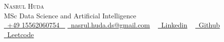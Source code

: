 \begin{center}
    {\Huge \scshape Nasrul Huda} \\ \vspace{1pt}
   MSc Data Science and Artificial Intelligence \\ \vspace{4pt}
    \small \href{tel:+4915562060754}{\faMobile*\ +49 15562060754 ~} \href{mailto:nasrul2001@gmail.com}{\faEnvelope\  nasrul.huda.ds@gmail.com} ~ 
    \href{https://www.linkedin.com/in/nasrul-hudaa/}{\faLinkedin\ Linkedin}  ~
    \href{https://github.com/nnayz}{\faGithub\ Github} ~
    \href{https://leetcode.com/u/nnasrull/}{\faLink\ Leetcode}  ~
\end{center}
